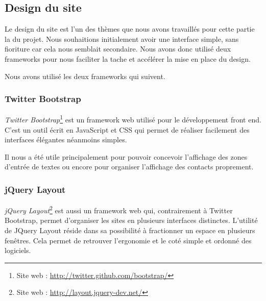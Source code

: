 
\subsection{Design du site}

Le design du site est l'un des thèmes que nous avons travaillés pour cette partie la du projet.
Nous souhaitions initialement avoir une interface simple, sans fioriture car cela nous semblait secondaire.
Nous avons donc utilisé deux frameworks pour nous faciliter la tache et accélérer la mise en place du design.

Nous avons utilisé les deux frameworks qui suivent.


\subsubsection{Twitter Bootstrap}

\textit{Twitter Bootstrap}\footnote{Site web : \href{http://twitter.github.com/bootstrap/}{http://twitter.github.com/bootstrap/}} est un framework web utilisé pour le développement front end.
C'est un outil écrit en JavaScript et CSS qui permet de réaliser facilement des interfaces élégantes néanmoins simples. 

Il nous a été utile principalement pour pouvoir concevoir l'affichage des zones d'entrée de textes ou encore pour organiser l'affichage des contacts proprement.


\subsubsection{jQuery Layout}

\textit{jQuery Layout}\footnote{Site web : \href{http://layout.jquery-dev.net/}{http://layout.jquery-dev.net/}} est aussi un framework web qui, contrairement à Twitter Bootstrap, permet d'organiser les sites en plusieurs interfaces distinctes. 
L'utilité de JQuery Layout réside dans sa possibilité à fractionner un espace en plusieurs fenêtres.
Cela permet de retrouver l'ergonomie et le coté simple et ordonné des logiciels. 

